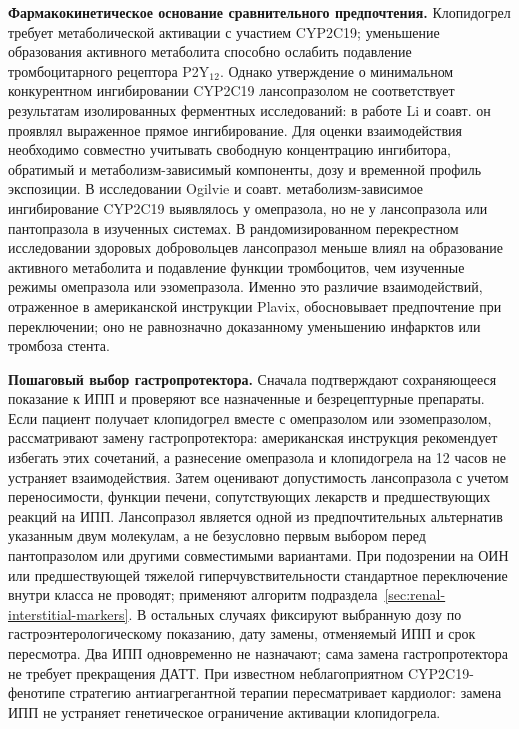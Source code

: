 \documentclass[11pt,a4paper,notitlepage]{report}
\newcommand{\src}[1]{\unskip\space\cite{#1}}
\begin{document}
\textbf{Фармакокинетическое основание сравнительного предпочтения.} Клопидогрел требует метаболической активации с участием CYP2C19; уменьшение образования активного метаболита способно ослабить подавление тромбоцитарного рецептора P2Y$_{12}$. Однако утверждение о минимальном конкурентном ингибировании CYP2C19 лансопразолом не соответствует результатам изолированных ферментных исследований: в работе Li и соавт. он проявлял выраженное прямое ингибирование. Для оценки взаимодействия необходимо совместно учитывать свободную концентрацию ингибитора, обратимый и метаболизм-зависимый компоненты, дозу и временной профиль экспозиции.\src{cardioli2004} В исследовании Ogilvie и соавт. метаболизм-зависимое ингибирование CYP2C19 выявлялось у омепразола, но не у лансопразола или пантопразола в изученных системах. В рандомизированном перекрестном исследовании здоровых добровольцев лансопразол меньше влиял на образование активного метаболита и подавление функции тромбоцитов, чем изученные режимы омепразола или эзомепразола. Именно это различие взаимодействий, отраженное в американской инструкции Plavix, обосновывает предпочтение при переключении; оно не равнозначно доказанному уменьшению инфарктов или тромбоза стента.\src{cardioogilvie2011,cardiofrelinger2012,cardioplavix2025}

\textbf{Пошаговый выбор гастропротектора.} Сначала подтверждают сохраняющееся показание к ИПП и проверяют все назначенные и безрецептурные препараты. Если пациент получает клопидогрел вместе с омепразолом или эзомепразолом, рассматривают замену гастропротектора: американская инструкция рекомендует избегать этих сочетаний, а разнесение омепразола и клопидогрела на 12 часов не устраняет взаимодействия. Затем оценивают допустимость лансопразола с учетом переносимости, функции печени, сопутствующих лекарств и предшествующих реакций на ИПП. Лансопразол является одной из предпочтительных альтернатив указанным двум молекулам, а не безусловно первым выбором перед пантопразолом или другими совместимыми вариантами.\src{cardioplavix2025,sps,uslabel} При подозрении на ОИН или предшествующей тяжелой гиперчувствительности стандартное переключение внутри класса не проводят; применяют алгоритм подраздела~\ref{sec:renal-interstitial-markers}. В остальных случаях фиксируют выбранную дозу по гастроэнтерологическому показанию, дату замены, отменяемый ИПП и срок пересмотра. Два ИПП одновременно не назначают; сама замена гастропротектора не требует прекращения ДАТТ. При известном неблагоприятном CYP2C19-фенотипе стратегию антиагрегантной терапии пересматривает кардиолог: замена ИПП не устраняет генетическое ограничение активации клопидогрела.\src{uslabel,cardiocpic2022}
\end{document}
